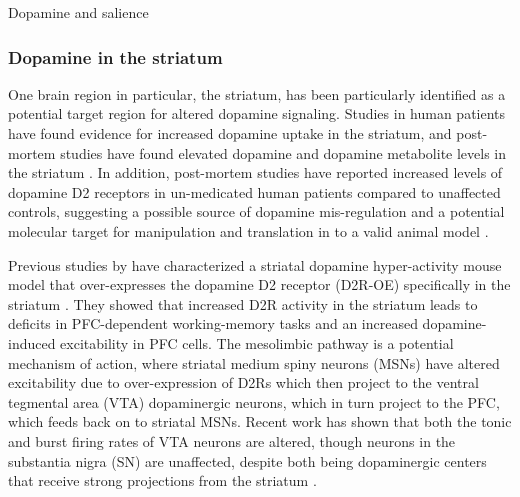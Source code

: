 Dopamine and salience


\subsubsection{Dopamine in the striatum}
\citep{Bogerts1985}
One brain region in particular, the striatum, has been particularly identified as a potential target region for altered dopamine signaling. Studies in human patients have found evidence for increased dopamine uptake in the striatum, and post-mortem studies have found elevated dopamine and dopamine metabolite levels in the striatum \citep{Simpson2010}.
In addition, post-mortem studies have reported increased levels of dopamine D2 receptors in un-medicated human patients compared to unaffected controls, suggesting a possible source of dopamine mis-regulation and a potential molecular target for manipulation and translation in to a valid animal model \citep{XXXX}.

Previous studies by \citeauthor{Kellendonk2006} have characterized a striatal dopamine hyper-activity mouse model that over-expresses the dopamine D2 receptor (D2R-OE) specifically in the striatum \citep{Kellendonk2006}.
They showed that increased D2R activity in the striatum leads to deficits in \ac{PFC}-dependent working-memory tasks and an increased dopamine-induced excitability in \ac{PFC} cells.
The mesolimbic pathway is a potential mechanism of action, where striatal medium spiny neurons (MSNs) have altered excitability due to over-expression of D2Rs which then project to the ventral tegmental area (VTA) dopaminergic neurons, which in turn project to the \ac{PFC}, which feeds back on to striatal MSNs.
Recent work has shown that both the tonic and burst firing rates of VTA neurons are altered, though neurons in the substantia nigra (SN) are unaffected, despite both being dopaminergic centers that receive strong projections from the striatum \citep{Krabbe2015}.



